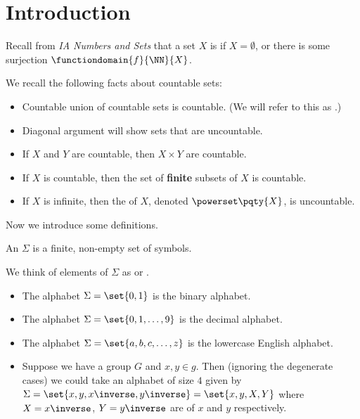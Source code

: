 \section{Introduction}

Recall from \textit{IA Numbers and Sets} that a set \(X\) is  if \(X = \emptyset\), or there is some surjection \(\functiondomain{f}{\NN}{X}\).

We recall the following facts about countable sets:
\begin{itemize}
    \item Countable union of countable sets is countable. (We will refer to this as .)
    \item Diagonal argument will show sets that are uncountable.
    \item If \(X\) and \(Y\) are countable, then \(X \times Y\) are countable.
    \item If \(X\) is countable, then the set of \textbf{finite} subsets of \(X\) is countable.
    \item If \(X\) is infinite, then the  of \(X\), denoted \(\powerset\pqty{X}\), is uncountable.
\end{itemize}

Now we introduce some definitions.

\begin{definition}[Alphabet]
    An  \(\Sigma\) is a finite, non-empty set of symbols.
\end{definition}

We think of elements of \(\Sigma\) as  or .

\begin{examples*}
    \begin{itemize}
        \item The alphabet \(\Sigma = \set{0, 1}\) is the binary alphabet.
        \item The alphabet \(\Sigma = \set{0, 1, \ldots, 9}\) is the decimal alphabet.
        \item The alphabet \(\Sigma = \set{a, b, c, \ldots, z}\) is the lowercase English alphabet.
        \item Suppose we have a group \(G\) and \(x, y \in g\). Then (ignoring the degenerate cases) we could take an alphabet of size \(4\) given by \(\Sigma = \set{x, y, x\inverse, y\inverse} = \set{x, y, X, Y}\) where \(X = x\inverse\), \(Y = y\inverse\) are  of \(x\) and \(y\) respectively.
    \end{itemize}
\end{examples*}


